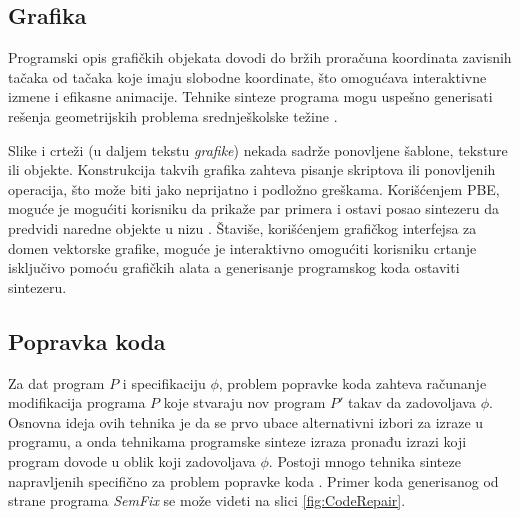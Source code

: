 \subsection{Grafika}
\label{subsec:Grafika}

Programski opis grafičkih objekata dovodi do bržih proračuna koordinata zavisnih tačaka od tačaka koje imaju slobodne koordinate, što omogućava interaktivne izmene i efikasne animacije. Tehnike sinteze programa mogu uspešno generisati rešenja geometrijskih problema sre\-dnje\-ško\-lske težine \cite{SynthesizingGeometryConstructions}.

Slike i crteži (u daljem tekstu \emph{grafike}) nekada sadrže ponovljene šablone, teksture ili objekte. Konstrukcija takvih grafika zahteva pisanje skriptova ili ponovljenih operacija, što može biti jako neprijatno i podložno greškama. Korišćenjem PBE, moguće je mogućiti korisniku da prikaže par primera i ostavi posao sintezeru da predvidi naredne objekte u nizu \cite{Backpropagation}. Štaviše, korišćenjem grafičkog interfejsa za domen vektorske grafike, moguće je interaktivno omogućiti korisniku crtanje isključivo pomoću grafičkih alata a generisanje programskog koda ostaviti sintezeru.


\subsection{Popravka koda}
\label{subsec:PopravkaKoda}

Za dat program $P$ i specifikaciju $\phi$, problem popravke koda zahteva računanje modifikacija programa $P$ koje stvaraju nov program $P'$ takav da zadovoljava $\phi$. Osnovna ideja ovih tehnika je da se prvo ubace alternativni izbori za izraze u programu, a onda tehnikama programske sinteze izraza pronađu izrazi koji program dovode u oblik koji zadovoljava $\phi$. Postoji mnogo tehnika sinteze napravljenih specifično za problem popravke koda \cite{Qlose, ProgramRepairAsAGame}. Primer koda generisanog od strane programa \emph{SemFix} \cite{SemFix} se može videti na slici \ref{fig:CodeRepair}.

